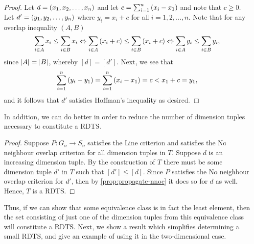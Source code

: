 \begin{proof}
Let $d = \left( x_1, x_2, \dotsc, x_n \right)$ and let $c = \sum_{i = 1}^n \left( x_i - x_1 \right)$ and note that $c \geq 0$. Let $d' = \left( y_1, y_2, \dotsc, y_n \right)$ where $y_i = x_i + c$ for all $i = 1, 2, \dotsc, n$. Note that for any overlap inequality $(A, B)$
\[
\sum_{i \in A} x_i \leq \sum_{i \in B} x_i \Leftrightarrow
\sum_{i \in A} \left( x_i + c \right) \leq \sum_{i \in B} \left( x_i + c \right) \Leftrightarrow
\sum_{i \in A} y_i \leq \sum_{i \in B} y_i,
\]
since $\lvert A\rvert = \lvert B\rvert$, whereby $[d] = [d']$. Next, we see that
\[
\sum_{i = 1}^n \left( y_i - y_1 \right) =
\sum_{i = 1}^n \left( x_i - x_1 \right) =
c < x_1 + c = y_1,
\]
and it follows that $d'$ satisfies Hoffman's inequality as desired.
\end{proof}

\noindent In addition, we can do better in order to reduce the number of dimension tuples necessary to constitute a RDTS.

\begin{proof}
Suppose $P\colon G_n \to S_n$ satisfies the Line criterion  and satisfies the No neighbour overlap criterion  for all dimension tuples in $T$. Suppose $d$ is an increasing dimension tuple. By the construction of $T$ there must be some dimension tuple $d'$ in $T$ such that $[d'] \leq [d]$. Since $P$ satisfies the No neighbour overlap criterion  for $d'$, then by \cref{prop:propagate-nnoc} it does so for $d$ as well. Hence, $T$ is a RDTS.
\end{proof}

\noindent Thus, if we can show that some equivalence class is in fact the least element, then the set consisting of just one of the dimension tuples from this equivalence class will constitute a RDTS. Next, we show a result which simplifies determining a small RDTS, and give an example of using it in the two-dimensional case.

